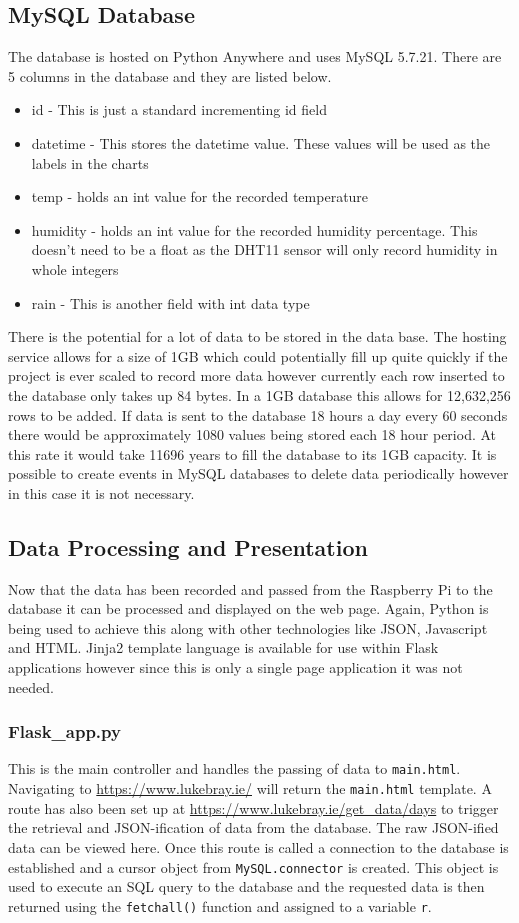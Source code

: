 \documentclass[10pt,a4paper]{article}
\begin{document}
\subsection{MySQL Database}
The database is hosted on Python Anywhere and uses MySQL 5.7.21. There are 5 columns in the database and they are listed below. 
\begin{itemize}
\item id - This is just a standard incrementing id field
\item datetime - This stores the datetime value. These values will be used as the labels in the charts
\item temp - holds an int value for the recorded temperature
\item humidity - holds an int value for the recorded humidity percentage. This doesn't need to be a float as the DHT11 sensor will only record humidity in whole integers
\item rain - This is another field with int data type
\end{itemize}

There is the potential for a lot of data to be stored in the data base. The hosting service allows for a size of 1GB which could potentially fill up quite quickly if the project is ever scaled to record more data however currently each row inserted to the database only takes up 84 bytes. In a 1GB database this allows for 12,632,256 rows to be added. If data is sent to the database 18 hours a day every 60 seconds there would be approximately 1080 values being stored each 18 hour period. At this rate it would take 11696 years to fill the database to its 1GB capacity. It is possible to create events in MySQL databases to delete data periodically however in this case it is not necessary. 

\subsection{Data Processing and Presentation}
Now that the data has been recorded and passed from the Raspberry Pi to the database it can be processed and displayed on the web page. Again, Python is being used to achieve this along with other technologies like JSON, Javascript and HTML. Jinja2 template language is available for use within Flask applications however since this is only a single page application it was not needed. 

\subsubsection{Flask\_app.py}
This is the main controller and handles the passing of data to \texttt{main.html}. Navigating to \url{https://www.lukebray.ie/} will return the \texttt{main.html} template. A route has also been set up at \url{https://www.lukebray.ie/get_data/days} to trigger the retrieval and JSON-ification of data from the database. The raw JSON-ified data can be viewed here. Once this route is called a connection to the database is established and a cursor object from \texttt{MySQL.connector} is created. This object is used to execute an SQL query to the database and the requested data is then returned using the \texttt{fetchall()} function and assigned to a variable \texttt{r}. 
\end{document}
